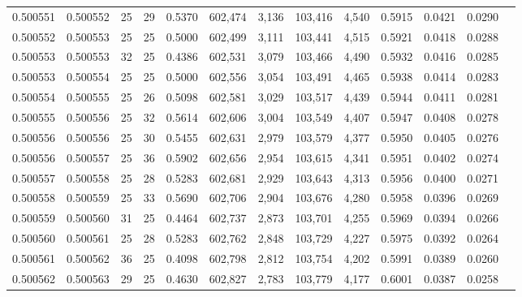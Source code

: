 \begin{tabular}{rrrrrrrrrrrrr}
0.500551 & 0.500552 &    25 &  29 &                                     0.5370 & 602,474 &   3,136 & 103,416 &   4,540 & 0.5915 & 0.0421 & 0.0290 \\
0.500552 & 0.500553 &    25 &  25 &                                     0.5000 & 602,499 &   3,111 & 103,441 &   4,515 & 0.5921 & 0.0418 & 0.0288 \\
0.500553 & 0.500553 &    32 &  25 &                                     0.4386 & 602,531 &   3,079 & 103,466 &   4,490 & 0.5932 & 0.0416 & 0.0285 \\
0.500553 & 0.500554 &    25 &  25 &                                     0.5000 & 602,556 &   3,054 & 103,491 &   4,465 & 0.5938 & 0.0414 & 0.0283 \\
0.500554 & 0.500555 &    25 &  26 &                                     0.5098 & 602,581 &   3,029 & 103,517 &   4,439 & 0.5944 & 0.0411 & 0.0281 \\
0.500555 & 0.500556 &    25 &  32 &                                     0.5614 & 602,606 &   3,004 & 103,549 &   4,407 & 0.5947 & 0.0408 & 0.0278 \\
0.500556 & 0.500556 &    25 &  30 &                                     0.5455 & 602,631 &   2,979 & 103,579 &   4,377 & 0.5950 & 0.0405 & 0.0276 \\
0.500556 & 0.500557 &    25 &  36 &                                     0.5902 & 602,656 &   2,954 & 103,615 &   4,341 & 0.5951 & 0.0402 & 0.0274 \\
0.500557 & 0.500558 &    25 &  28 &                                     0.5283 & 602,681 &   2,929 & 103,643 &   4,313 & 0.5956 & 0.0400 & 0.0271 \\
0.500558 & 0.500559 &    25 &  33 &                                     0.5690 & 602,706 &   2,904 & 103,676 &   4,280 & 0.5958 & 0.0396 & 0.0269 \\
0.500559 & 0.500560 &    31 &  25 &                                     0.4464 & 602,737 &   2,873 & 103,701 &   4,255 & 0.5969 & 0.0394 & 0.0266 \\
0.500560 & 0.500561 &    25 &  28 &                                     0.5283 & 602,762 &   2,848 & 103,729 &   4,227 & 0.5975 & 0.0392 & 0.0264 \\
0.500561 & 0.500562 &    36 &  25 &                                     0.4098 & 602,798 &   2,812 & 103,754 &   4,202 & 0.5991 & 0.0389 & 0.0260 \\
0.500562 & 0.500563 &    29 &  25 &                                     0.4630 & 602,827 &   2,783 & 103,779 &   4,177 & 0.6001 & 0.0387 & 0.0258 \\

\end{tabular}
